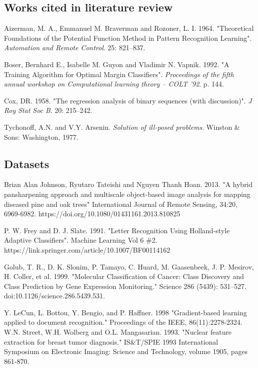 \documentclass[letterpaper, 11pt]{article}
\begin{document}
\subsection{Works cited in literature review}

Aizerman, M. A., Emmanuel M. Braverman and Rozoner, L. I. 1964. "Theoretical Foundations of the Potential Function Method in Pattern Recognition Learning". \emph{Automation and Remote Control}. 25: 821–837.

Boser, Bernhard E., Isabelle M. Guyon and Vladimir N. Vapnik. 1992. "A Training Algorithm for Optimal Margin Classifiers". \emph{Proceedings of the fifth annual workshop on Computational learning theory – COLT '92}. p. 144.

Cox, DR. 1958. "The regression analysis of binary sequences (with discussion)". \emph{J Roy Stat Soc B}. 20: 215–242.

Tychonoff, A.N. and V.Y. Arsenin. \emph{Solution of ill-posed problems}. Winston \& Sons: Washington, 1977.

\subsection{Datasets}

Brian Alan Johnson, Ryutaro Tateishi and Nguyen Thanh Hoan. 2013. "A hybrid pansharpening approach and multiscale object-based image analysis for mapping diseased pine and oak trees" International Journal of Remote Sensing, 34:20, 6969-6982. https://doi.org/10.1080/01431161.2013.810825

P. W. Frey and D. J. Slate. 1991. "Letter Recognition Using Holland-style Adaptive Classifiers". Machine Learning Vol 6 \#2. https://link.springer.com/article/10.1007/BF00114162

Golub, T. R., D. K. Slonim, P. Tamayo, C. Huard, M. Gaasenbeek, J. P. Mesirov, H. Coller, et al. 1999. "Molecular Classification of Cancer: Class Discovery and Class Prediction by Gene Expression Monitoring." Science 286 (5439): 531–527. doi:10.1126/science.286.5439.531.

Y. LeCun, L. Bottou, Y. Bengio, and P. Haffner. 1998 "Gradient-based learning applied to document recognition." Proceedings of the IEEE, 86(11):2278-2324.
W.N. Street, W.H. Wolberg and O.L. Mangasarian. 1993. "Nuclear feature extraction for breast tumor diagnosis." IS\&T/SPIE 1993 International Symposium on Electronic Imaging: Science and Technology, volume 1905, pages 861-870.
\end{document}
